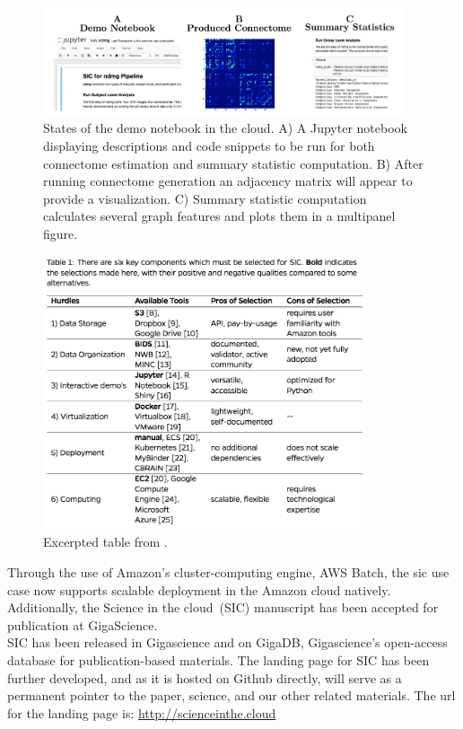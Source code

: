 \documentclass[simplex.tex]{subfiles}
\begin{document}
\begin{figure}[h!]
\begin{cframed}
\centering
\includegraphics[width=0.95\textwidth]{../../figs/sic.png}
\caption{
  States of the demo notebook in the cloud. A) A Jupyter notebook
  displaying descriptions and code snippets to be run for both
  connectome estimation and summary statistic computation. B) After
  running connectome generation an adjacency matrix will appear to
  provide a visualization. C) Summary statistic computation calculates
  several graph features and plots them in a multipanel figure. 
}
\label{fig:sic}
\end{cframed}
\end{figure}

\begin{figure}[h!]
\begin{cframed}
\centering
\includegraphics[width=0.85\textwidth]{../../figs/sicTab.png}
\caption{
  Excerpted table from \protect{}.
}
\label{fig:sicTab}
\end{cframed}
\end{figure}

Through the use of Amazon's cluster-computing engine, AWS Batch, the sic use case now supports scalable deployment in
the Amazon cloud natively. Additionally, the Science in the cloud~(SIC) manuscript has been accepted for publication at
GigaScience.\\


SIC has been released in Gigascience and on GigaDB, Gigascience's open-access database for publication-based materials.
The landing page for SIC has been further developed, and as it is hosted on Github directly, will serve as a permanent
pointer to the paper, science, and our other related materials. The url for the landing page is:
\url{http://scienceinthe.cloud}

\clearpage
\end{document}
